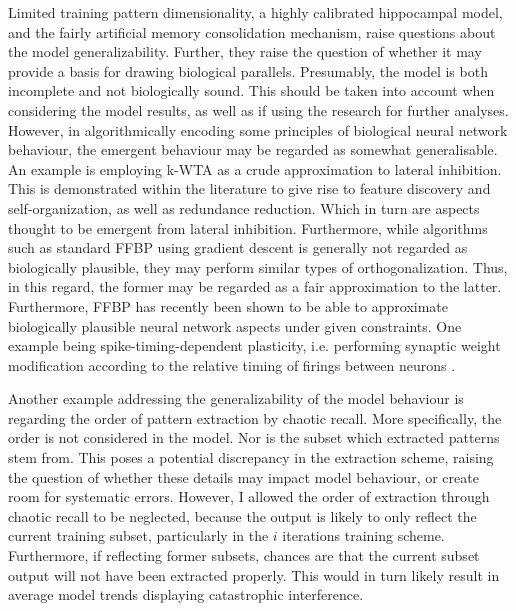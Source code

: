 

Limited training pattern dimensionality, a highly calibrated hippocampal model, and the fairly artificial memory consolidation mechanism, raise questions about the model generalizability. Further, they raise the question of whether it may provide a basis for drawing biological parallels.
Presumably, the model is both incomplete and not biologically sound. This should be taken into account when considering the model results, as well as if using the research for further analyses. However, in algorithmically encoding some principles of biological neural network behaviour, the emergent behaviour may be regarded as somewhat generalisable.
An example is employing k-WTA as a crude approximation to lateral inhibition. This is demonstrated within the literature to give rise to feature discovery and self-organization, as well as redundance reduction. Which in turn are aspects thought to be emergent from lateral inhibition. 
Furthermore, while algorithms such as standard FFBP using gradient descent is generally not regarded as biologically plausible, they may perform similar types of orthogonalization. Thus, in this regard, the former may be regarded as a fair approximation to the latter. Furthermore, FFBP has recently been shown to be able to approximate biologically plausible neural network aspects under given constraints. One example being spike-timing-dependent plasticity, i.e. performing synaptic weight modification according to the relative timing of firings between neurons \citep{Bengio2015}.

Another example addressing the generalizability of the model behaviour is regarding the order of pattern extraction by chaotic recall. More specifically, the order is not considered in the model. Nor is the subset which extracted patterns stem from. This poses a potential discrepancy in the extraction scheme, raising the question of whether these details may impact model behaviour, or create room for systematic errors. However, I allowed the order of extraction through chaotic recall to be neglected, because the output is likely to only reflect the current training subset, particularly in the $i$ iterations training scheme. Furthermore, if reflecting former subsets, chances are that the current subset output will not have been extracted properly. This would in turn likely result in average model trends displaying catastrophic interference.

